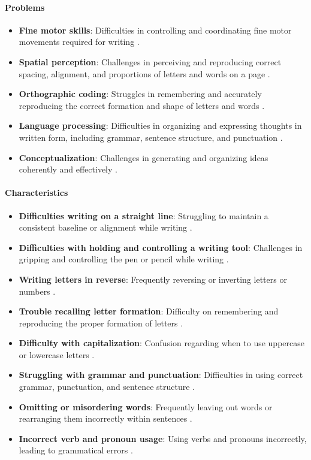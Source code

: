 \paragraph{Problems}
\begin{itemize}
    \item \textbf{Fine motor skills}: Difficulties in controlling and coordinating fine motor movements required for writing \cite{cleveland_dysgraphia}.
    \item \textbf{Spatial perception}: Challenges in perceiving and reproducing correct spacing, alignment, and proportions of letters and words on a page \cite{cleveland_dysgraphia}.
    \item \textbf{Orthographic coding}: Struggles in remembering and accurately reproducing the correct formation and shape of letters and words \cite{cleveland_dysgraphia}.
    \item \textbf{Language processing}: Difficulties in organizing and expressing thoughts in written form, including grammar, sentence structure, and punctuation \cite{cleveland_dysgraphia}.
    \item \textbf{Conceptualization}: Challenges in generating and organizing ideas coherently and effectively \cite{cleveland_dysgraphia}.
\end{itemize}

\paragraph{Characteristics}
\begin{itemize}
    \item \textbf{Difficulties writing on a straight line}: Struggling to maintain a consistent baseline or alignment while writing \cite{cleveland_dysgraphia}.
    \item \textbf{Difficulties with holding and controlling a writing tool}: Challenges in gripping and controlling the pen or pencil while writing \cite{understood_accommodations}.
    \item \textbf{Writing letters in reverse}: Frequently reversing or inverting letters or numbers \cite{pmc_dysgraphia}.
    \item \textbf{Trouble recalling letter formation}: Difficulty on remembering and reproducing the proper formation of letters \cite{edutopia_dysgraphia}.
    \item \textbf{Difficulty with capitalization}: Confusion regarding when to use uppercase or lowercase letters \cite{cleveland_dysgraphia}.
    \item \textbf{Struggling with grammar and punctuation}: Difficulties in using correct grammar, punctuation, and sentence structure \cite{cleveland_dysgraphia}.
    \item \textbf{Omitting or misordering words}: Frequently leaving out words or rearranging them incorrectly within sentences \cite{cleveland_dysgraphia}.
    \item \textbf{Incorrect verb and pronoun usage}: Using verbs and pronouns incorrectly, leading to grammatical errors \cite{cleveland_dysgraphia}.
\end{itemize}

